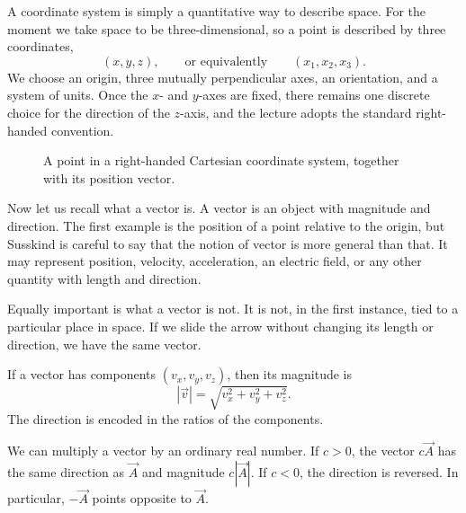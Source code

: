 A coordinate system is simply a quantitative way to describe space. For the moment we take space to be three-dimensional, so a point is described by three coordinates,
\[
(x,y,z),
\qquad \text{or equivalently} \qquad
(x_1,x_2,x_3).
\]
We choose an origin, three mutually perpendicular axes, an orientation, and a system of units. Once the \(x\)- and \(y\)-axes are fixed, there remains one discrete choice for the direction of the \(z\)-axis, and the lecture adopts the standard right-handed convention.

\begin{figure}
\centering
{}
\caption{A point in a right-handed Cartesian coordinate system, together with its position vector.}
\end{figure}

Now let us recall what a vector is. A vector is an object with magnitude and direction. The first example is the position of a point relative to the origin, but Susskind is careful to say that the notion of vector is more general than that. It may represent position, velocity, acceleration, an electric field, or any other quantity with length and direction.

Equally important is what a vector is not. It is not, in the first instance, tied to a particular place in space. If we slide the arrow without changing its length or direction, we have the same vector.

If a vector has components \((v_x,v_y,v_z)\), then its magnitude is
\begin{equation}
|\vec v|=\sqrt{v_x^2+v_y^2+v_z^2}.
\end{equation}
The direction is encoded in the ratios of the components.

We can multiply a vector by an ordinary real number. If \(c>0\), the vector \(c\vec A\) has the same direction as \(\vec A\) and magnitude \(c|\vec A|\). If \(c<0\), the direction is reversed. In particular, \(-\vec A\) points opposite to \(\vec A\).

